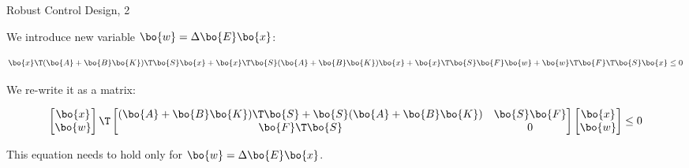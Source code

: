 \documentclass{beamer}
\begin{document}
\begin{frame}{Robust Control Design, 2}
	\begin{flushleft}
		
		We introduce new variable $\bo{w} = \Delta \bo{E} \bo{x}$:
		
		\begin{equation*}
			\bo{x}\T(\bo{A} + \bo{B}\bo{K})\T\bo{S}\bo{x}
			+
			\bo{x}\T \bo{S} (\bo{A} + \bo{B}\bo{K})\bo{x}
			+
			\bo{x}\T\bo{S}\bo{F}\bo{w} + \bo{w}\T\bo{F}\T\bo{S}\bo{x} \leq 0
		\end{equation*}
		
		We re-write it as a matrix:
		
		\begin{equation}
			\label{eq:quad_xw_1}
			\begin{bmatrix}
				\bo{x} \\ \bo{w}
			\end{bmatrix}\T
			\begin{bmatrix}
				(\bo{A} + \bo{B}\bo{K})\T\bo{S} + \bo{S} (\bo{A} + \bo{B}\bo{K}) & \bo{S}\bo{F} \\
				\bo{F}\T\bo{S} & 0
			\end{bmatrix}
			\begin{bmatrix}
				\bo{x} \\ \bo{w}
			\end{bmatrix} \leq 0
		\end{equation}		
		
		This equation needs to hold only for $\bo{w} = \Delta \bo{E} \bo{x}$.
		
		
		
	\end{flushleft}
\end{frame}
\end{document}
